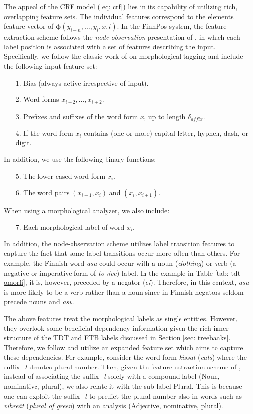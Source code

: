 \documentclass[smallextended]{svjour3}       %
\begin{document}
The appeal of the CRF model (\ref{eq: crf}) lies in its capability of utilizing rich, overlapping feature sets. The individual features correspond to the elements feature vector of $\boldsymbol{\phi}(y_{i-n}, \dots, y_i, x, i)$. In the FinnPos system, the feature extraction scheme follows the \emph{node-observation} presentation of \cite{sutton2011}, in which each label position is associated with  a set of features describing the input. Specifically, we follow the classic work of \citet{ratnaparkhi1996} on morphological tagging and include the following input feature set:
%
\begin{itemize}
\item[1.] Bias (always active irrespective of input).
\item[2.] Word forms $x_{i-2}, \dots, x_{i+2}$.
\item[3.] Prefixes and suffixes of the word form $x_i$ up to length $\delta_{affix}$.
\item[4.] If the word form $x_i$ contains (one or more) capital letter, hyphen, dash, or digit.
\end{itemize}
%
In addition, we use the following binary functions:
\begin{itemize}
\item[5.] The lower-cased word form $x_{i}$.
\item[6.] The word pairs $(x_{i-1}, x_i)$ and $(x_i, x_{i+1})$.
\end{itemize}
When using a morphological analyzer, we also include:
\begin{itemize}
\item[7.] Each morphological label of word $x_i$.
\end{itemize}
%

In addition, the node-observation scheme utilizes label transition features to capture the fact that some label transitions occur more often than others. For example, the Finnish word {\it asu} could occur with a noun ({\it clothing}) or verb (a negative or imperative form of {\it to live}) label. In the example in Table \ref{tab: tdt omorfi}, it is, however, preceded by a negator ({\it ei}). Therefore, in this context, {\it asu} is more likely to be a verb rather than a noun since in Finnish negators seldom precede nouns and {\it asu}.

The above features treat the morphological labels as single entities. However, they overlook some beneficial dependency information given the rich inner structure of the TDT and FTB labels discussed in Section \ref{sec: treebanks}. Therefore, we follow \citet{silfverberg2014} and utilize an expanded feature set which aims to capture these dependencies. For example, consider the word form \emph{kissat} (\emph{cats}) where the suffix \emph{-t} denotes plural number.  Then, given the feature extraction scheme of \citet{silfverberg2014}, instead of associating the suffix \emph{-t} solely with a compound label (Noun, nominative, plural), we also relate it with the sub-label Plural. This is because one can exploit the suffix \emph{-t} to predict the plural number also in words such as \emph{vihre\"at} (\emph{plural of green}) with an analysis (Adjective, nominative, plural). 
\end{document}
